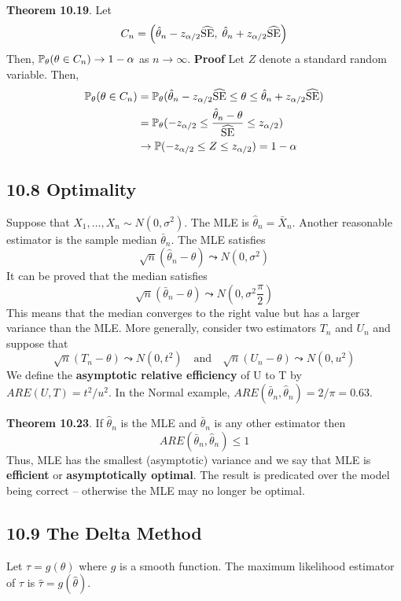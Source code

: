 \textbf{Theorem 10.19}. Let
\[
C_{n} = \left( \hat{\theta}_{n} - z_{\alpha/2} \widehat{\SE}, \; \hat{\theta}_{n} + z_{\alpha/2} \widehat{\SE} \right)
\]
Then, \(\operatorname{\mathbb{P}}_\theta(\theta \in C_{n}) \rightarrow 1 - \alpha\) as
\(n \rightarrow \infty\).
\textbf{Proof} Let \(Z\) denote a standard random variable. Then,
\begin{align*}
\operatorname{\mathbb{P}}_\theta(\theta \in C_{n}) 
&= \operatorname{\mathbb{P}}_\theta(\hat{\theta}_{n} - z_{\alpha/2} \widehat{\operatorname{\mathrm{SE}}} \leq \theta \leq \hat{\theta}_{n} + z_{\alpha/2} \widehat{\operatorname{\mathrm{SE}}}) \\
&= \operatorname{\mathbb{P}}_\theta(-z_{\alpha/2} \leq \frac{\hat{\theta}_{n} - \theta}{\widehat{\operatorname{\mathrm{SE}}}} \leq z_{\alpha/2}) \\
&\rightarrow \operatorname{\mathbb{P}}(-z_{\alpha/2} \leq Z \leq z_{\alpha/2}) = 1 - \alpha
\end{align*}

\subsection*{10.8 Optimality}\label{optimality}
Suppose that \(X_{1}, \dots, X_{n} \sim N(0, \sigma^{2})\). The MLE is
\(\hat{\theta}_{n} = \bar{X}_{n}\). Another reasonable estimator is the
sample median \(\bar{\theta}_{n}\). The MLE satisfies
\[
\sqrt{n}(\hat{\theta}_{n} - \theta) \leadsto N(0, \sigma^{2})
\]
It can be proved that the median satisfies
\[
\sqrt{n}(\bar{\theta}_{n} - \theta) \leadsto N\left(0, \sigma^{2} \frac{\pi}{2} \right)
\]
This means that the median converges to the right value but has a larger
variance than the MLE.
More generally, consider two estimators \(T_{n}\) and \(U_{n}\) and suppose
that
\[
\sqrt{n}(T_{n} - \theta) \leadsto N(0, t^{2}) 
\quad \text{and} \quad 
\sqrt{n}(U_{n} - \theta) \leadsto N(0, u^{2})
\]
We define the \textbf{asymptotic relative efficiency} of U to T by
\(ARE(U, T) = t^{2}/u^{2}\). In the Normal example,
\(ARE(\bar{\theta}_{n}, \hat{\theta}_{n}) = 2 / \pi = 0.63\).

\textbf{Theorem 10.23}. If \(\hat{\theta}_{n}\) is the MLE and
\(\bar{\theta}_{n}\) is any other estimator then
\[
ARE(\bar{\theta}_{n}, \hat{\theta}_{n}) \leq 1
\]
Thus, MLE has the smallest (asymptotic) variance and we say that MLE is
\textbf{efficient} or \textbf{asymptotically optimal}.
The result is predicated over the model being correct -- otherwise the
MLE may no longer be optimal.

\subsection*{10.9 The Delta Method}\label{delta:method}
Let \(\tau = g(\theta)\) where \(g\) is a smooth function. The maximum
likelihood estimator of \(\tau\) is \(\hat{\tau} = g(\hat{\theta})\).

